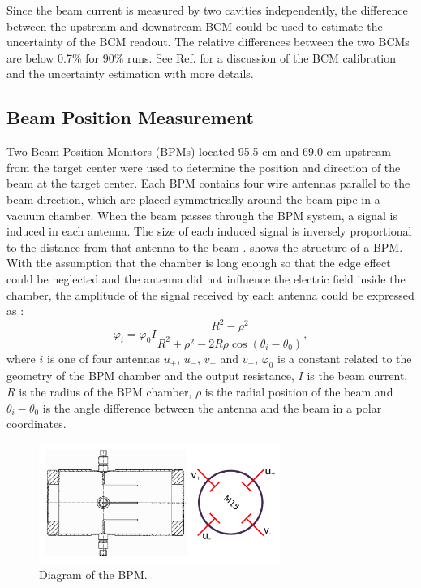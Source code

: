 Since the beam current is measured by two cavities independently, the difference between the upstream and downstream BCM could be used to estimate the uncertainty of the BCM readout. The relative differences between the two BCMs are below 0.7\% for 90\% runs. See Ref. \cite{Zhu2015} for a discussion of the BCM calibration and the uncertainty estimation with more details.

\subsection{Beam Position Measurement}
\label{C5S2SS3}

Two Beam Position Monitors (BPMs) located 95.5 cm and 69.0 cm upstream from the target center were used to determine the position and direction of the beam at the target center. Each BPM contains four wire antennas parallel to the beam direction, which are placed symmetrically around the beam pipe in a vacuum chamber. When the beam passes through the BPM system, a signal is induced in each antenna. The size of each induced signal is inversely proportional to the distance from that antenna to the beam \cite{Barry1991}.  shows the structure of a BPM. With the assumption that the chamber is long enough so that the edge effect could be neglected and the antenna did not influence the electric field inside the chamber, the amplitude of the signal received by each antenna could be expressed as \cite{Piot2005}:
\begin{equation} \label{C5S2SS3E1}
\varphi_i = \varphi_0 I\frac{R^2-\rho^2}{R^2+\rho^2-2R\rho\cos(\theta_i-\theta_0)},
\end{equation}
where $i$ is one of four antennas $u_+$, $u_-$, $v_+$ and $v_-$, $\varphi_0$ is a constant related to the geometry of the BPM chamber and the output resistance, $I$ is the beam current, $R$ is the radius of the BPM chamber, $\rho$ is the radial position of the beam and $\theta_i-\theta_0$ is the angle difference between the antenna and the beam in a polar coordinates.

\begin{figure}[tb!]
  \centering
  \includegraphics[width=0.7\textwidth]{figs/bpm-design.png}
  \caption[Diagram of the BPM.]{Diagram of the BPM. \label{C5S2SS3F1}}
\end{figure}

